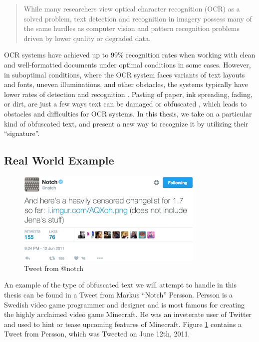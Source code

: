 \begin{quote}
    While many researchers view optical character recognition (OCR) as a solved problem, text detection and recognition in imagery possess many of the same hurdles as computer vision and pattern recognition problems driven by lower quality or degraded data.
\end{quote}

OCR systems have achieved up to 99\% recognition rates when working with clean and well-formatted documents under optimal conditions in some cases. However, in suboptimal conditions, where the OCR system faces variants of text layouts and fonts, uneven illuminations, and other obstacles, the systems typically have lower rates of detection and recognition \citep{ye2015text}. Pasting of paper, ink spreading, fading, or dirt, are just a few ways text can be damaged or obfuscated \citep{bhardwaj2014imaging}, which leads to obstacles and difficulties for OCR systems. In this thesis, we take on a particular kind of obfuscated text, and present a new way to recognize it by utilizing their ``signature''.

\subsection{Real World Example}
\begin{figure}[ht]
    \centering
    \includegraphics[width=0.8\textwidth]{fig/chapter1/notch_tweet.jpg}
    \caption{Tweet from @notch}
    \label{ref:notch_twitter}
\end{figure}

An example of the type of obfuscated text we will attempt to handle in this thesis can be found in a Tweet from Markus ``Notch'' Persson. Persson is a Swedish video game programmer and designer and is most famous for creating the highly acclaimed video game Minecraft. He was an inveterate user of Twitter and used to hint or tease upcoming features of Minecraft. Figure \ref{ref:notch_twitter} contains a Tweet from Persson, which was Tweeted on June 12th, 2011.

